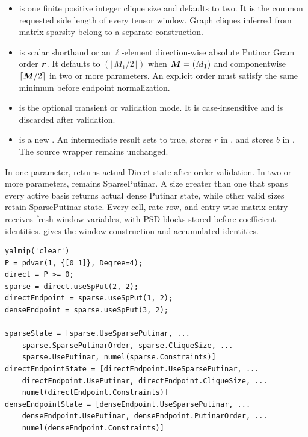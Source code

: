 \arghead
\begin{itemize}[leftmargin=*]
  \item {} is one finite positive integer clique size and defaults to two. It is the common requested side length of every tensor window. Graph cliques inferred from matrix sparsity belong to a separate construction.
  \item {} is scalar shorthand or an $\ell$-element direction-wise absolute Putinar Gram order $\boldsymbol{r}$. It defaults to $(\lfloor M_1/2\rfloor)$ when $\boldsymbol{M}=(M_1)$ and componentwise $\lceil\boldsymbol{M}/2\rceil$ in two or more parameters. An explicit order must satisfy the same minimum before endpoint normalization.
  \item {} is the optional transient  or  validation mode. It is case-insensitive and is discarded after validation.
  \item {} is a new . An intermediate result sets  to true, stores $r$ in , and stores $b$ in . The source wrapper remains unchanged.
\end{itemize}

\descriptionhead
In one parameter,  returns actual Direct state after order validation. In two or more parameters,  remains SparsePutinar. A size greater than one that spans every active basis returns actual dense Putinar state, while other valid sizes retain SparsePutinar state. Every cell, rate row, and entry-wise matrix entry receives fresh window variables, with PSD blocks stored before coefficient identities.  gives the window construction and accumulated identities.

\examplehead
\begin{lstlisting}[style=dpmatlab]
yalmip('clear')
P = pdvar(1, {[0 1]}, Degree=4);
direct = P >= 0;
sparse = direct.useSpPut(2, 2);
directEndpoint = sparse.useSpPut(1, 2);
denseEndpoint = sparse.useSpPut(3, 2);

sparseState = [sparse.UseSparsePutinar, ...
    sparse.SparsePutinarOrder, sparse.CliqueSize, ...
    sparse.UsePutinar, numel(sparse.Constraints)]
directEndpointState = [directEndpoint.UseSparsePutinar, ...
    directEndpoint.UsePutinar, directEndpoint.CliqueSize, ...
    numel(directEndpoint.Constraints)]
denseEndpointState = [denseEndpoint.UseSparsePutinar, ...
    denseEndpoint.UsePutinar, denseEndpoint.PutinarOrder, ...
    numel(denseEndpoint.Constraints)]
\end{lstlisting}

